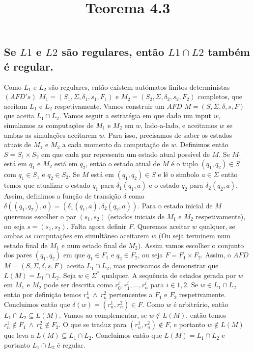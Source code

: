 \title{Teorema 4.3}

\subsection{Se $L1$ e $L2$ são regulares, então $L1 \cap L2$ também é regular.}

\begin{spacing}{1.5}
  Como $L_1$ e $L_2$ são regulares, então existem autómatos finitos deterministas
  $(AFD's)$ $M_1 = (S_1, \Sigma, \delta_1, s_1, F_1)$ e $M_2 = (S_2, \Sigma, \delta_2, s_2, F_2)$ completos, que aceitam $L_1$ e $L_2$ respetivamente. Vamos construir um $AFD$ $M = (S, \Sigma, \delta, s, F)$ que aceita $L_1 \cap L_2$.
  Vamos seguir a estratégia em que dado um input $w$, simulamos as computações de $M_1$ e $M_2$ em $w$, lado-a-lado, e aceitamos $w$ se ambas as simulações aceitarem $w$. Para isso, precisamos de saber os estados atuais de $M_1$ e $M_2$ a cada momento da computação de $w$. Definimos então $S = S_1 \times S_2$ em que cada par representa um estado atual possível de $M$. Se $M_1$ está em $q_1$ e $M_2$ está em $q_2$, então o estado atual de $M$ é o tuplo $(q_1, q_2) \in S$ com $q_1 \in S_1$ e $q_2 \in S_2$. Se $M$ está em $(q_1,q_2) \in S$ e lê o simbolo $a \in \Sigma$ então temos que atualizar o estado $q_1$ para $\delta_1(q_1, a)$ e o estado $q_2$ para $\delta_2(q_2, a)$. Assim, definimos a função de transição $\delta$ como $\delta((q_1,q_2), a) = (\delta_1(q_1, a), \delta_2(q_2, a))$. Para o estado inicial de $M$ queremos escolher o par $(s_1,s_2)$ (estados iniciais de $M_1$ e $M_2$ respetivamente), ou seja $s = (s_1,s_2)$. Falta agora definir $F$. Queremos aceitar $w$ qualquer, se ambas as computações em simultâneo aceitarem $w$ (Ou seja terminem num estado final de $M_1$ e num estado final de $M_2$). Assim vamos escolher o conjunto dos pares $(q_1,q_2)$ em que $q_1 \in F_1$ e $q_2 \in F_2$, ou seja $F = F_1 \times F_2$. Assim, o $AFD$ $M = (S, \Sigma, \delta, s, F)$ aceita $L_1 \cap L_2$, mas precisamos de demonstrar que $L(M) = L_1 \cap L_2$. Seja $w \in \Sigma^{*}$ qualquer. A sequência de estados gerada por $w$ em $M_1$ e $M_2$ pode ser descrita como $r_0^{i}, r_1^{i}, \hdots, r_n^{i}$ para $i \in {1,2}$. Se $w \in L_1 \cap L_2$ então por definição temos $r_n^{1} \ \wedge \ r_n^{2}$ pertencentes a $F_1$ e $F_2$ respetivamente. Concluimos então que $\delta(w) = (r_n^{1},r_n^{2}) \in F$. Como $w$ é arbitrário, então $L_1 \cap L_2 \subseteq L(M)$. Vamos ao complementar, se $w \notin L(M)$, então temos $r_n^{1} \notin F_1 \ \wedge \ r_n^{2} \notin F_2$. O que se traduz para $(r_n^{1},r_n^{2}) \notin F$, e portanto $w \notin L(M)$ que leva a $L(M) \subseteq L_1 \cap L_2$. Concluimos então que $L(M) = L_1 \cap L_2$ e portanto $L_1 \cap L_2$ é regular.
\end{spacing}